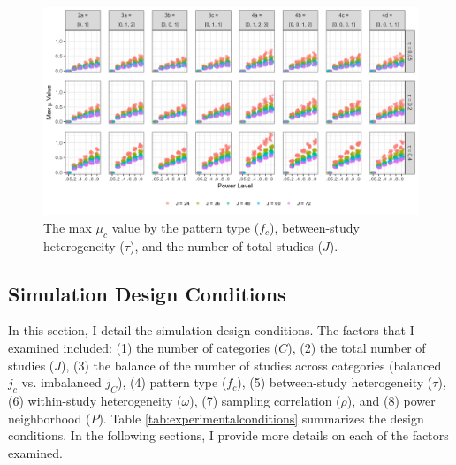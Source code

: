 \begin{figure}
    \centering
    \vspace{-5pt}\includegraphics[width=\linewidth]{chapters/plots/max_mu.png}\caption{The max $\mu_c$ value by the pattern type ($f_c$), between-study heterogeneity ($\tau$), and the number of total studies ($J$). \label{fig:max_mu}}
    \vspace{-5pt}
\end{figure}




\subsection{Simulation Design Conditions}\label{sec:simulationdesgin}

In this section, I detail the simulation design conditions. The factors that I examined included: (1) the number of categories ($C$), (2) the total number of studies ($J$), (3) the balance of the number of studies across categories (balanced $j_c$ vs. imbalanced $j_C$), (4) pattern type ($f_c$), (5) between-study heterogeneity ($\tau$), (6) within-study heterogeneity ($\omega$), (7) sampling correlation ($\rho$), and (8) power neighborhood ($P$). Table \ref{tab:experimentalconditions} summarizes the design conditions. In the following sections, I provide more details on each of the factors examined. 



